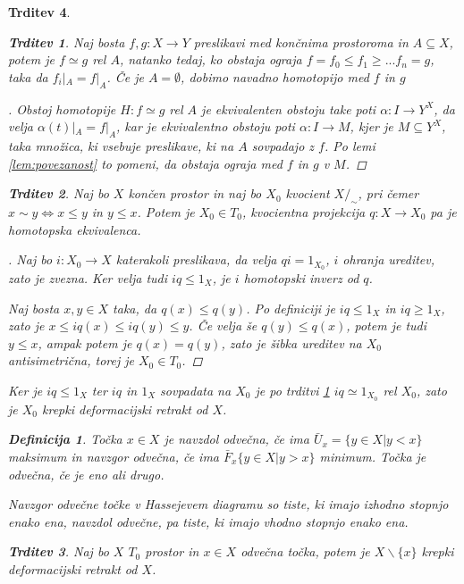 \documentclass[a4paper,12pt]{article}
\theoremstyle{definition}
\newtheorem{definicija}{Definicija}
\theoremstyle{plain}
\theoremstyle{definition}
\theoremstyle{plain}
\newtheorem{trditev}{Trditev}
\theoremstyle{plain}
\theoremstyle{plain}
\theoremstyle{plain}
\newenvironment{dokaz}{\begin{proof}[\bfseries\upshape\proofname]}{\end{proof}}
\begin{document}
\begin{trditev}
\begin{trditev}
    \label{iz:ograje}
Naj bosta $f,g: X\rightarrow Y$ preslikavi med končnima prostoroma in $A\subseteq X$, potem je $f\simeq g$ rel $A$, natanko tedaj, ko obstaja ograja $f=f_0\leq f_1\geq ... f_n=g$, taka da $f_i|_A=f|_A$. Če je $A=\emptyset$, dobimo navadno homotopijo med $f$ in $g$
\end{trditev}

\begin{dokaz}
    Obstoj homotopije $H:f\simeq g$ rel $A$ je ekvivalenten obstoju take poti $\alpha: I \rightarrow Y^X$, da velja $\alpha(t)|_A=f|_A$, kar je ekvivalentno obstoju poti 
    $\alpha: I \rightarrow M$, kjer je $M\subseteq Y^X$, taka množica, ki vsebuje preslikave, ki na $A$ sovpadajo z $f$. Po lemi \ref{lem:povezanost} to pomeni, da obstaja ograja 
    med $f$ in $g$ v $M$.
\end{dokaz}

\begin{trditev}
    Naj bo $X$ končen prostor in naj bo $X_0$ kvocient $X/_\sim$, pri čemer $x\sim y \Leftrightarrow x\le y$ in $y\le x$. Potem je $X_0\in T_0$, kvocientna projekcija $q:X\rightarrow X_0$ pa je homotopska ekvivalenca.
\end{trditev}

\begin{dokaz}
    Naj bo $i:X_0\rightarrow X$ katerakoli preslikava, da velja $qi=1_{X_0}$, $i$ ohranja ureditev, zato je zvezna. Ker velja tudi $iq \leq 1_X$, je $i$ homotopski inverz od $q$.

    Naj bosta $x,y\in X$ taka, da $q(x)\leq q(y)$. Po definiciji je $iq \leq 1_X$ in $iq \geq 1_X$, zato je $x \leq iq(x) \leq iq(y) \leq y$. Če velja še $q(y)\leq q(x)$, potem je tudi $y\leq x$, ampak potem je $q(x)=q(y)$, zato je šibka ureditev na $X_0$ antisimetrična, torej je $X_0\in T_0$.
\end{dokaz}


    Ker je $iq\leq 1_X$ ter $iq$ in $1_X$ sovpadata na $X_0$ je po trditvi \ref{iz:ograje} 
    $iq \simeq 1_{X_0}$ rel $X_0$, zato je $X_0$ krepki deformacijski retrakt od $X$.

\begin{definicija}
    Točka $x \in X$ je \textit{navzdol odvečna}, če ima $\bar{U}_x=\{y\in X | y < x\}$ maksimum in \textit{navzgor odvečna}, če ima $\bar{F}_x\{y\in X | y > x\}$ minimum. 
    Točka je odvečna, če je eno ali drugo.
\end{definicija}

Navzgor odvečne točke v Hassejevem diagramu so tiste, ki imajo 
izhodno stopnjo enako ena, navzdol odvečne, pa tiste, ki imajo vhodno stopnjo enako ena.
\begin{trditev}
Naj bo $X$ $T_0$ prostor in $x\in X$ odvečna točka, potem je $X\backslash \{x\}$ krepki deformacijski retrakt od $X$.
\end{trditev}


\end{trditev}
\end{document}
